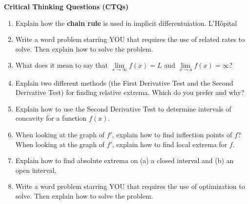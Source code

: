 \documentclass[12pt]{article}
\begin{document}
	
	
	\textbf{Critical Thinking Questions (CTQs)}
	
	
	\begin{enumerate}
		\setlength\itemsep{1em}

		\item Explain how the \textbf{chain rule} is used in implicit differentuiation.  L'H\^{o}pital
		\item Write a word problem starring YOU that requires the use of related rates to solve. Then explain how to solve the problem. 
		\item What does it mean to say that $\lim\limits_{x \to \infty}f(x)=L$ and $\lim\limits_{x \to a}f(x)=\infty$?
		\item Explain two different methods (the First Derivative Test and the Second Derivative Test) for finding relative extrema. Which do you prefer and why?
		\item Explain how to use the Second Derivative Test to determine intervals of concavity for a function $f(x)$.
		\item When looking at the graph of $f'$, explain how to find inflection points of $f$? When looking at the graph of $f'$, explain how to find local extrema for $f$.
		\item Explain how to find absolute extrema on (a) a closed interval and (b) an open interval.
		\item Write a word problem starring YOU that requires the use of optimization to solve. Then explain how to solve the problem.
	\end{enumerate}
	
	
\end{document}
